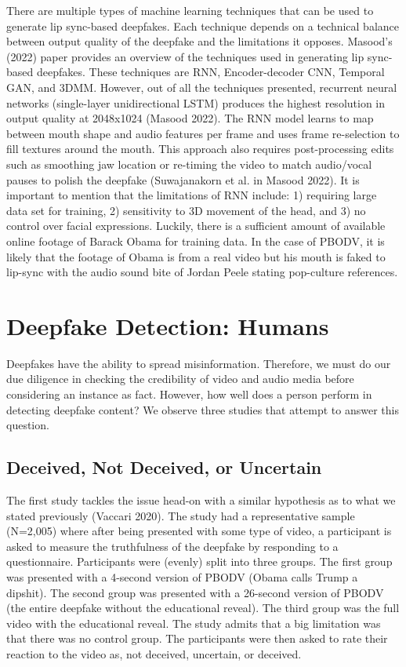 \documentclass[
  journal=small,
  manuscript=article-type,  %
  year=2020,
  volume=37,
]{cup-journal}
\begin{document}
There are multiple types of machine learning techniques that can be used to generate lip sync-based deepfakes. Each technique depends on a technical balance between output quality of the deepfake and the limitations it opposes. Masood's (2022) paper provides an overview of the techniques used in generating lip sync-based deepfakes. These techniques are RNN, Encoder-decoder CNN, Temporal GAN, and 3DMM. However, out of all the techniques presented, recurrent neural networks (single-layer unidirectional LSTM) produces the highest resolution in output quality at 2048x1024 (Masood 2022). The RNN model learns to map between mouth shape and audio features per frame and uses frame re-selection to fill textures around the mouth. This approach also requires post-processing edits such as smoothing jaw location or re-timing the video to match audio/vocal pauses to polish the deepfake (Suwajanakorn et al. in Masood 2022). It is important to mention that the limitations of RNN include: 1) requiring large data set for training, 2) sensitivity to 3D movement of the head, and 3) no control over facial expressions. Luckily, there is a  sufficient amount of available online footage of Barack Obama for training data. In the case of PBODV, it is likely that the footage of Obama is from a real video but his mouth is faked to lip-sync with the audio sound bite of Jordan Peele stating pop-culture references.

\section{Deepfake Detection: Humans}
Deepfakes have the ability to spread misinformation. Therefore, we must do our due diligence in checking the credibility of video and audio media before considering an instance as fact. However, how well does a person perform in detecting deepfake content? We observe three studies that attempt to answer this question.

\subsection{Deceived, Not Deceived, or Uncertain}
The first study tackles the issue head-on with a similar hypothesis as to what we stated previously (Vaccari 2020). The study had a representative sample (N=2,005) where after being presented with some type of video, a participant is asked to measure the truthfulness of the deepfake by responding to a questionnaire. Participants were (evenly) split into three groups. The first group was presented with a 4-second version of PBODV (Obama calls Trump a dipshit). The second group was presented with a 26-second version of PBODV (the entire deepfake without the educational reveal). The third group was the full video with the educational reveal. The study admits that a big limitation was that there was no control group. The participants were then asked to rate their reaction to the video as, not deceived, uncertain, or deceived. 
\end{document}
